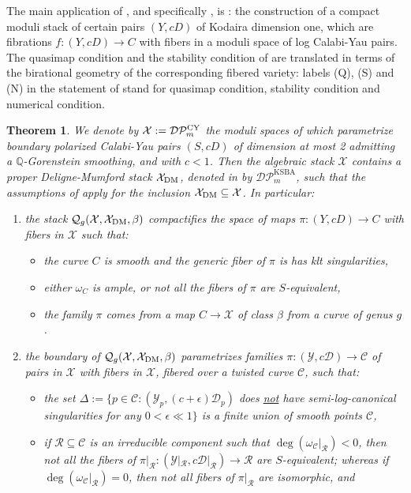 \documentclass{amsart}
\newcommand{\bQ}{\mathbb{Q}}
\newcommand{\sC}{\mathscr{C}}
\newcommand{\sD}{\mathscr{D}}
\newcommand{\sR}{\mathscr{R}}
\newcommand{\cD}{\mathcal{D}}
\newcommand{\cP}{\mathcal{P}}
\newcommand{\cQ}{\mathcal{Q}}
\newcommand{\cX}{\mathcal{X}}
\newcommand{\sY}{\mathscr{Y}}
\newcommand{\dm}{{\rm DM}}
\newcommand{\CY}{{\rm CY}}
\newtheorem{Teo}[theorem]{Theorem}
\theoremstyle{definition}
\theoremstyle{definition}
\begin{document}
{ The main application of , and specifically , is : the construction of a compact moduli stack of certain pairs $(Y,cD)$ of Kodaira dimension one, which are fibrations $f\colon (Y,cD)\to C$ with fibers in a moduli space of log Calabi-Yau pairs. The quasimap condition and the stability condition of  are translated in terms of the birational geometry of the corresponding fibered variety: labels (Q), (S) and (N) in the statement of  stand for quasimap condition, stability condition and numerical condition.
\begin{Teo}\label{teo_intro_kodairadim1}
    We denote by $\cX:=\cD\cP^{\CY}_m$ the moduli spaces of \cites{blum2024good} which parametrize boundary polarized Calabi-Yau pairs $(S,cD)$ of dimension at most 2 admitting a $\bQ$-Gorenstein smoothing, and with $c<1$. Then the algebraic stack $\cX$ contains a proper Deligne-Mumford stack $\cX_\dm$, denoted in \cite{blum2024good} by $\cD\cP^{\operatorname{KSBA}}_m$, such that the  assumptions of  apply for the inclusion $\cX_\dm\subseteq \cX$. In particular:
    \begin{enumerate}
        \item the stack $\cQ_g(\cX,\cX_\dm,\beta)$ compactifies the space of maps $\pi\colon(Y,cD)\to C$ with fibers in $\cX$ such that:
        \begin{itemize}
            \item[(Q)] the curve $C$ is smooth and the generic fiber of $\pi$ is has klt singularities,
            \item[(S)] either $\omega_C$ is ample, or not all the fibers of $\pi$ are $S$-equivalent,
            \item[(N)] the family $\pi$ comes from a map $C\to \cX$ of class $\beta$ from a curve of genus $g$.
        \end{itemize}
        \item the boundary of $\cQ_g(\cX,\cX_\dm,\beta)$ parametrizes families $\pi:(\sY,c\sD)\to \sC$ of pairs in $\cX$ with fibers in $\cX$, fibered over a twisted curve $\sC$, such that:
        \begin{itemize}
            \item[(Q)] the set $\Delta:=\{p\in \sC:(\sY_p,(c+\epsilon)\sD_p)$ does \underline{not} have semi-log-canonical singularities for any $0<\epsilon \ll 1\}$ is a finite union of smooth points $\sC$,
            \item[(S)] if $\sR\subseteq \sC$ is an irreducible component such that $\deg(\omega_\sC |_\sR)< 0$, then not all the fibers of $\pi|_\sR\colon(\sY|_\sR,c\sD|_\sR)\to \sR$ are $S$-equivalent; whereas if $\deg(\omega_\sC |_\sR)=0$, then not all fibers of $\pi|_\sR$ are isomorphic, and

\end{itemize}
\end{enumerate}
\end{Teo}}
\end{document}
